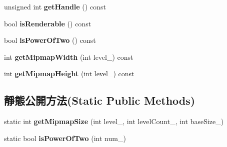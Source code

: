 \begin{DoxyCompactItemize}
\item 
unsigned int {\bfseries get\+Handle} () const \hypertarget{class_magnum_1_1_g_x_pixel_buffer_af22085ae79f9d3cfdff5c4d6e0852d45}{}\label{class_magnum_1_1_g_x_pixel_buffer_af22085ae79f9d3cfdff5c4d6e0852d45}

\item 
bool {\bfseries is\+Renderable} () const \hypertarget{class_magnum_1_1_g_x_pixel_buffer_aa85b6f66faa63184cc9af1f2dc9b749e}{}\label{class_magnum_1_1_g_x_pixel_buffer_aa85b6f66faa63184cc9af1f2dc9b749e}

\item 
bool {\bfseries is\+Power\+Of\+Two} () const \hypertarget{class_magnum_1_1_g_x_pixel_buffer_a461dbf167bc573bcaa7dad7eaf7911c9}{}\label{class_magnum_1_1_g_x_pixel_buffer_a461dbf167bc573bcaa7dad7eaf7911c9}

\item 
int {\bfseries get\+Mipmap\+Width} (int level\+\_\+) const \hypertarget{class_magnum_1_1_g_x_pixel_buffer_aeadca3a1498815c2c8d26e94d0332148}{}\label{class_magnum_1_1_g_x_pixel_buffer_aeadca3a1498815c2c8d26e94d0332148}

\item 
int {\bfseries get\+Mipmap\+Height} (int level\+\_\+) const \hypertarget{class_magnum_1_1_g_x_pixel_buffer_ae43c6cebb2fc3550de05569ceb386a91}{}\label{class_magnum_1_1_g_x_pixel_buffer_ae43c6cebb2fc3550de05569ceb386a91}

\end{DoxyCompactItemize}
\subsection*{靜態公開方法(Static Public Methods)}
\begin{DoxyCompactItemize}
\item 
static int {\bfseries get\+Mipmap\+Size} (int level\+\_\+, int level\+Count\+\_\+, int base\+Size\+\_\+)\hypertarget{class_magnum_1_1_g_x_pixel_buffer_a17f4c1d28e605361c15408d761a12793}{}\label{class_magnum_1_1_g_x_pixel_buffer_a17f4c1d28e605361c15408d761a12793}

\item 
static bool {\bfseries is\+Power\+Of\+Two} (int num\+\_\+)\hypertarget{class_magnum_1_1_g_x_pixel_buffer_aa5d8e35a9b2eabc730ab1e27c5a4a05c}{}\label{class_magnum_1_1_g_x_pixel_buffer_aa5d8e35a9b2eabc730ab1e27c5a4a05c}

\end{DoxyCompactItemize}
